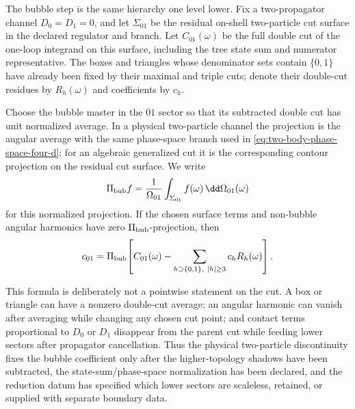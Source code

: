 \begin{controlledapproximation}
\label{ca:double-cut-bubble-projection}
The bubble step is the same hierarchy one level lower.  Fix a two-propagator
channel \(D_0=D_1=0\), and let \(\Sigma_{01}\) be the residual on-shell
two-particle cut surface in the declared regulator and branch.  Let
\(C_{01}(\omega)\) be the full double cut of the one-loop integrand on this
surface, including the tree state sum and numerator representative.  The
boxes and triangles whose denominator sets contain \(\{0,1\}\) have already
been fixed by their maximal and triple cuts; denote their double-cut residues
by \(R_h(\omega)\) and coefficients by \(c_h\).

Choose the bubble master in the \(01\) sector so that its subtracted double
cut has unit normalized average.  In a physical two-particle channel the
projection is the angular average with the same phase-space branch used in
\eqref{eq:two-body-phase-space-four-d}; for an algebraic generalized cut it is
the corresponding contour projection on the residual cut surface.  We write
\begin{equation}
  \Pi_{\rm bub}f
  =
  \frac{1}{\Omega_{01}}
  \int_{\Sigma_{01}} f(\omega)\,\dd\Omega_{01}(\omega)
  \label{eq:double-cut-bubble-projection-average}
\end{equation}
for this normalized projection.  If the chosen surface terms and non-bubble
angular harmonics have zero \(\Pi_{\rm bub}\)-projection, then
\begin{equation}
  c_{01}
  =
  \Pi_{\rm bub}\!\left[
    C_{01}(\omega)
    -
    \sum_{h\supset\{0,1\},\ |h|\ge3} c_h R_h(\omega)
  \right].
  \label{eq:double-cut-bubble-coefficient-after-subtractions}
\end{equation}

This formula is deliberately not a pointwise statement on the cut.  A box or
triangle can have a nonzero double-cut average; an angular harmonic can vanish
after averaging while changing any chosen cut point; and contact terms
proportional to \(D_0\) or \(D_1\) disappear from the parent cut while feeding
lower sectors after propagator cancellation.  Thus the physical two-particle
discontinuity fixes the bubble coefficient only after the higher-topology
shadows have been subtracted, the state-sum/phase-space normalization has been
declared, and the reduction datum has specified which lower sectors are
scaleless, retained, or supplied with separate boundary data.
\end{controlledapproximation}

